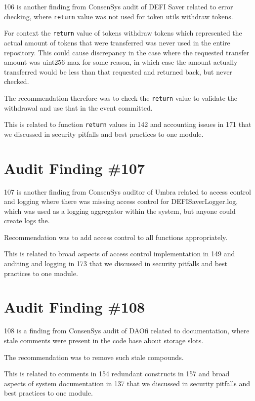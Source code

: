 106 is another finding from ConsenSys audit of DEFI Saver related to error checking, where \verb|return| value was not used for token utils withdraw tokens. 

For context the \verb|return| value of tokens withdraw tokens which represented the actual amount of tokens that were transferred was never used in the entire repository. This could cause discrepancy in the case where the requested transfer amount was uint256 max for some reason, in which case the amount actually transferred would be less than that requested and returned back, but never checked.

The recommendation therefore was to check the \verb|return| value to validate the withdrawal and use that in the event committed. 

This is related to function \verb|return| values in 142 and accounting issues in 171 that we discussed in security pitfalls and best practices to one module.

\section{Audit Finding \#107}

107 is another finding from ConsenSys auditor of Umbra related to access control and logging where there was missing access control for DEFISaverLogger.log, which was used as a logging aggregator within the system, but anyone could create logs the. 

Recommendation was to add access control to all functions appropriately.

This is related to broad aspects of access control implementation in 149 and auditing and logging in 173 that we discussed in security pitfalls and best practices to one module.

\section{Audit Finding \#108}

108 is a finding from ConsenSys audit of DAOfi related to documentation, where stale comments were present in the code base about storage slots. 

The recommendation was to remove such stale compounds.

This is related to comments in 154 redundant constructs in 157 and broad aspects of system documentation in 137 that we discussed in security pitfalls and best practices to one module.

